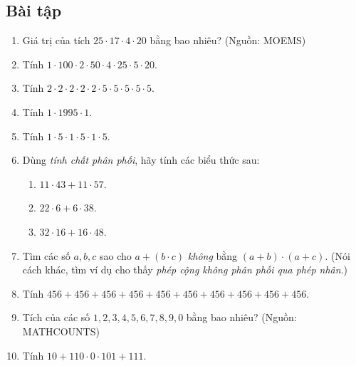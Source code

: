 \documentclass[14pt,a4paper]{extbook}
\begin{document}
\subsection*{Bài tập}

\begin{enumerate}[label=1.3.\arabic*.]
  \item Giá trị của tích \(25\cdot17\cdot4\cdot20\) bằng bao nhiêu?
        \hfill\small(Nguồn: MOEMS)
  \item Tính \(1\cdot100\cdot2\cdot50\cdot4\cdot25\cdot5\cdot20\).
  \item Tính \(2\cdot2\cdot2\cdot2\cdot2\cdot5\cdot5\cdot5\cdot5\cdot5\).
  \item Tính \(1\cdot1995\cdot1\).
  \item Tính \(1\cdot5\cdot1\cdot5\cdot1\cdot5\).
  \item Dùng \emph{tính chất phân phối}, hãy tính các biểu thức sau:
    \begin{enumerate}[label=(\alph*)]
      \item \(11\cdot43 + 11\cdot57\).
      \item \(22\cdot6 + 6\cdot38\).
      \item \(32\cdot16 + 16\cdot48\).
    \end{enumerate}
  \item Tìm các số \(a,b,c\) sao cho \(a+(b\cdot c)\) \emph{không} bằng
        \((a+b)\cdot(a+c)\).
        (Nói cách khác, tìm ví dụ cho thấy \emph{phép cộng không phân phối
        qua phép nhân}.)
  \item Tính \(456+456+456+456+456+456+456+456+456+456\).
  \item Tích của các số \(1,2,3,4,5,6,7,8,9,0\) bằng bao nhiêu?
        \hfill\small(Nguồn: MATHCOUNTS)
  \item Tính \(10+110\cdot0\cdot101+111\).
\end{enumerate}
\end{document}
